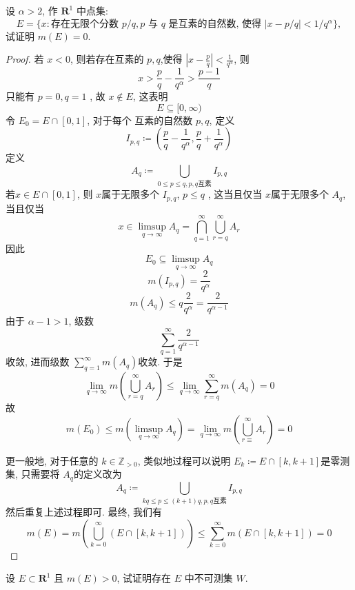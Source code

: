 \documentclass[../main.tex]{subfiles}
\begin{document}
\begin{exercise}{}{}
设 $\alpha>2$, 作 $\mathbf{R}^1$ 中点集:
\[
E = \{x: \text{存在无限个分数 } p/q, p \text{ 与 } q \text{ 是互素的自然数, 使得 } |x - p/q| < 1/q^\alpha\},
\]
试证明 $m(E)=0$.
\end{exercise}
\begin{proof}
    若 \(  x< 0  \), 则若存在互素的 \(  p,q  \),使得 \(  \left| x-\frac{p }{q }  \right|< \frac{1 }{q^{\alpha } }    \), 则 \[
    x> \frac{p }{q }-\frac{1 }{q^{\alpha } }> \frac{p-1 }{q }   
    \]只能有 \(  p = 0, q=  1  \)     , 故 \(  x\not \in E  \), 这表明 \[
    E\subseteq [0,\infty)
    \] 
    令 \(  E_0= E\cap \left[ 0,1 \right]   \), 对于每个 互素的自然数 \(  p,q  \), 定义 \[
    I_{p,q}\coloneqq \left( \frac{p }{q }-\frac{1 }{q^{\alpha } }, \frac{p }{q }+ \frac{1 }{q^{\alpha } }     \right) 
    \]  定义 \[
    A_{q}\coloneqq \bigcup _{0\le p\le q, p,q\text{互素}  }I_{p,q}
    \]  若\(  x\in E  \cap \left[ 0,1 \right] \), 则 \(  x  \)属于无限多个 \(  I_{p,q}  \), \(  p\le q  \) , 这当且仅当 \(  x  \)属于无限多个 \(  A_{q}  \), 当且仅当 \[
    x \in \limsup_{q\to \infty}A_{q}= \bigcap _{q = 1}^{\infty}\bigcup _{r= q}^{\infty}A_{r}
    \]     因此 \[
    E_0\subseteq \limsup_{q\to \infty}A_{q}
    \] \[
    m\left( I_{p,q} \right)= \frac{2 }{q^{\alpha } }  
    \] \[
    m\left( A_{q} \right)\le q\frac{2 }{q^{\alpha } }= \frac{2 }{q^{\alpha -1} }   
    \] 由于 \(  \alpha -1> 1  \), 级数 \[
    \sum _{ q = 1}^{\infty}\frac{2 }{q^{\alpha -1} } 
    \]收敛, 进而级数 \(  \sum _{q = 1}^{\infty}m\left( A_{q} \right)   \)收敛.  于是 \[
    \lim_{q\to \infty}m\left( \bigcup _{r = q}^{\infty}A_{r} \right)\le \lim_{q\to \infty} \sum _{ r = q}^{\infty}m\left( A_{q} \right)  = 0
    \]故 \[
  m\left( E_0 \right)\le    m\left( \limsup_{q\to \infty}A_{q}\right)= \lim_{q\to \infty}m\left( \bigcup _{r\equiv }^{\infty}A_{r} \right)=  0 
    \]

    更一般地, 对于任意的 \(  k \in \mathbb{Z}_{> 0} \), 类似地过程可以说明 \(  E_{k}\coloneqq  E\cap \left[ k,k+ 1 \right]   \)是零测集, 只需要将 \(  A_{q}  \)的定义改为 \[
    A_{q}\coloneqq \bigcup _{kq\le p\le \left( k+ 1 \right)q ,  p,q\text{互素}}I_{p,q}
    \]   然后重复上述过程即可. 最终, 我们有 \[
   m\left( E \right)= m\left( \bigcup _{k = 0}^{\infty}\left( E\cap \left[ k,k+ 1 \right]  \right)  \right)  \le \sum _{k = 0}^{\infty}m\left( E\cap \left[ k,k+ 1 \right]  \right)= 0 
    \]
\end{proof}
\begin{exercise}{}{}
设 $E \subset \mathbf{R}^1$ 且 $m(E) > 0$, 试证明存在 $E$ 中不可测集 $W$.
\end{exercise}
\end{document}

